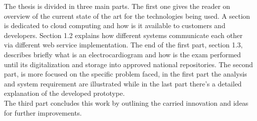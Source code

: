 The thesis is divided in three main parts. The first one gives the reader on overview of the current state of the art for the technologies being used. A section is dedicated to cloud computing and how is it available to customers and developers. Section 1.2 explains how different systems communicate each other via different web service implementation. The end of the first part, section 1.3, describes briefly what is an electrocardiogram and how is the exam performed until its digitalization and storage into approved national repositories. The second part, is more focused on the specific problem faced, in the first part the analysis and system requirement are illustrated while in the last part there's a detailed explanation of the developed prototype.\\The third part concludes this work by outlining the carried innovation and ideas for further improvements.